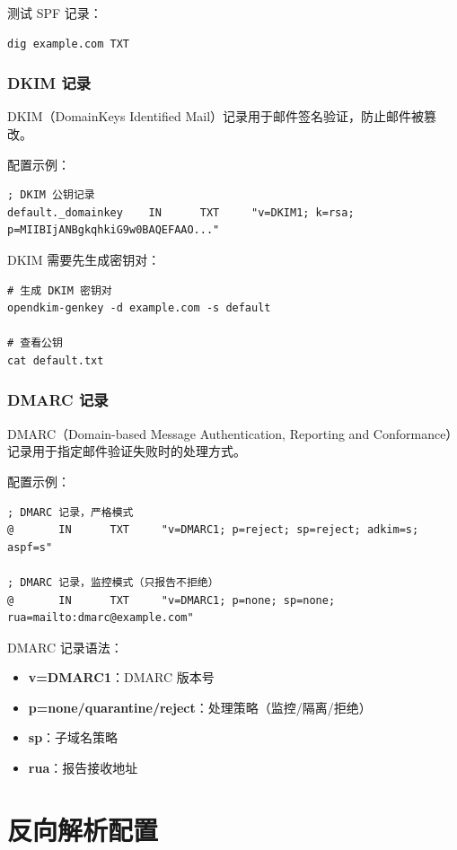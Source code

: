 \documentclass[12pt,UTF8]{ctexbook}
\begin{document}
测试 SPF 记录：
\begin{verbatim}
dig example.com TXT
\end{verbatim}

\subsection{DKIM 记录}

DKIM（DomainKeys Identified Mail）记录用于邮件签名验证，防止邮件被篡改。

配置示例：
\begin{verbatim}
; DKIM 公钥记录
default._domainkey    IN      TXT     "v=DKIM1; k=rsa; p=MIIBIjANBgkqhkiG9w0BAQEFAAO..."
\end{verbatim}

DKIM 需要先生成密钥对：
\begin{verbatim}
# 生成 DKIM 密钥对
opendkim-genkey -d example.com -s default

# 查看公钥
cat default.txt
\end{verbatim}

\subsection{DMARC 记录}

DMARC（Domain-based Message Authentication, Reporting and Conformance）记录用于指定邮件验证失败时的处理方式。

配置示例：
\begin{verbatim}
; DMARC 记录，严格模式
@       IN      TXT     "v=DMARC1; p=reject; sp=reject; adkim=s; aspf=s"

; DMARC 记录，监控模式（只报告不拒绝）
@       IN      TXT     "v=DMARC1; p=none; sp=none; rua=mailto:dmarc@example.com"
\end{verbatim}

DMARC 记录语法：
\begin{itemize}
    \item \textbf{v=DMARC1}：DMARC 版本号
    \item \textbf{p=none/quarantine/reject}：处理策略（监控/隔离/拒绝）
    \item \textbf{sp}：子域名策略
    \item \textbf{rua}：报告接收地址
\end{itemize}

\chapter{反向解析配置}
\label{chap:reverse_dns}
\end{document}

